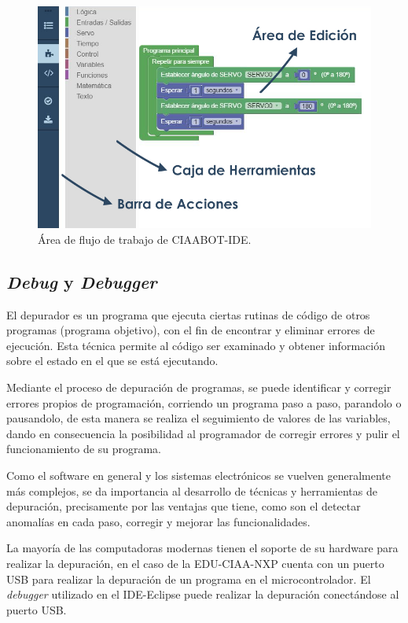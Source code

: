 \begin{figure}[h]
	\centering
	\includegraphics[scale=.50]{./Figures/editor.PNG}
	\caption{Área de flujo de trabajo de CIAABOT-IDE.}
	\label{fig:editor}
\end{figure}

\subsection{\emph{Debug} y \emph{Debugger}}
\label{Debug y Debugger}

El depurador es un programa que ejecuta ciertas rutinas de código de otros programas (programa objetivo), con el fin de encontrar y eliminar errores de ejecución. Esta técnica permite al código ser examinado y obtener información sobre el estado en el que se está ejecutando.

Mediante el proceso de depuración de programas, se puede identificar y corregir errores propios de programación, corriendo un programa paso a paso, parandolo o pausandolo, de esta manera se realiza el seguimiento de
valores de las variables, dando en consecuencia la posibilidad al programador
de corregir errores y pulir el funcionamiento de su programa.

Como el software en general y los sistemas electrónicos se vuelven generalmente
más complejos, se da importancia al desarrollo de técnicas y herramientas de depuración,
precisamente por las ventajas que tiene, como son el detectar anomalías
en cada paso, corregir y mejorar las funcionalidades. 

La mayoría de las computadoras modernas tienen el soporte de su hardware para
realizar la depuración, en el caso de la EDU-CIAA-NXP cuenta con un puerto USB
para realizar la depuración de un programa en el microcontrolador. El \emph{debugger}
utilizado en el IDE-Eclipse puede realizar la depuración conectándose al puerto
USB.

